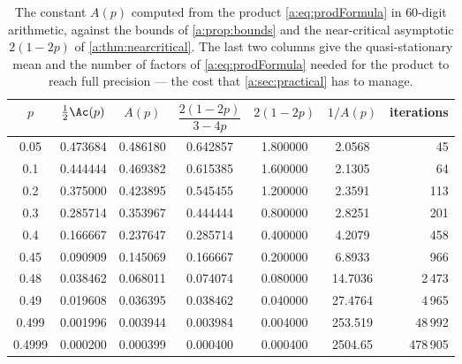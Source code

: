 \begin{table}[ht]
\centering
\caption{The constant $A(p)$ computed from the product \cref{a:eq:prodFormula} in
$60$-digit arithmetic, against the bounds of \cref{a:prop:bounds} and the
near-critical asymptotic $2(1-2p)$ of \cref{a:thm:nearcritical}. The last two
columns give the quasi-stationary mean and the
number of factors of \cref{a:eq:prodFormula} needed for the product to reach full
precision --- the cost that \cref{a:sec:practical} has to manage.}
\label{a:tab:Avals}
\begin{tabular}{ccccccr}
\toprule
$p$ & $\tfrac12\Ac(p)$ & $A(p)$ & $\dfrac{2(1-2p)}{3-4p}$ & $2(1-2p)$ & $1/A(p)$ & iterations\\
\midrule
0.05   & 0.473684 & 0.486180 & 0.642857 & 1.800000 & 2.0568 & 45 \\
0.1    & 0.444444 & 0.469382 & 0.615385 & 1.600000 & 2.1305 & 64 \\
0.2    & 0.375000 & 0.423895 & 0.545455 & 1.200000 & 2.3591 & 113 \\
0.3    & 0.285714 & 0.353967 & 0.444444 & 0.800000 & 2.8251 & 201 \\
0.4    & 0.166667 & 0.237647 & 0.285714 & 0.400000 & 4.2079 & 458 \\
0.45   & 0.090909 & 0.145069 & 0.166667 & 0.200000 & 6.8933 & 966 \\
0.48   & 0.038462 & 0.068011 & 0.074074 & 0.080000 & 14.7036 & 2\,473 \\
0.49   & 0.019608 & 0.036395 & 0.038462 & 0.040000 & 27.4764 & 4\,965 \\
0.499  & 0.001996 & 0.003944 & 0.003984 & 0.004000 & 253.519 & 48\,992 \\
0.4999 & 0.000200 & 0.000399 & 0.000400 & 0.000400 & 2504.65 & 478\,905 \\
\bottomrule
\end{tabular}
\end{table}
